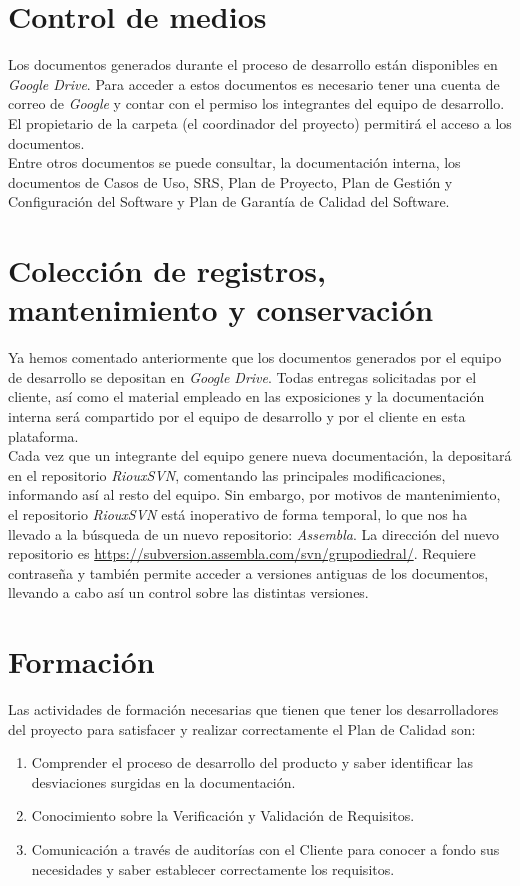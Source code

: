 \documentclass[11pt, a4paper, twoside, titlepage]{article}
\begin{document}
	\section{Control de medios} %
		Los documentos generados durante el proceso de desarrollo están disponibles en \textit{Google Drive}. Para acceder a estos documentos es necesario tener una cuenta de correo de \textit{Google} y contar con el permiso los integrantes del equipo de desarrollo. El propietario de la carpeta (el coordinador del proyecto) permitirá el acceso a los documentos. \\
		Entre otros documentos se puede consultar, la documentación interna, los documentos de Casos de Uso, SRS, Plan de Proyecto, Plan de Gestión y Configuración del Software y Plan de Garantía de Calidad del Software.


	\section{Colección de registros, mantenimiento y conservación} %
		Ya hemos comentado anteriormente que los documentos generados por el equipo de desarrollo se depositan en \textit{Google Drive}. Todas entregas solicitadas por el cliente, así como el material empleado en las exposiciones y la documentación interna será compartido por el equipo de desarrollo y por el cliente en esta plataforma. \\
		Cada vez que un integrante del equipo genere nueva documentación, la depositará en el repositorio \textit{RiouxSVN},  comentando las principales modificaciones, informando así al resto del equipo. Sin embargo, por motivos de mantenimiento, el repositorio \textit{RiouxSVN} está inoperativo de forma temporal, lo que nos ha llevado a la búsqueda de un nuevo repositorio: \textit{Assembla}. La dirección del nuevo repositorio es \url{https://subversion.assembla.com/svn/grupodiedral/}. Requiere contraseña y también permite acceder a versiones antiguas de los documentos, llevando a cabo así un control sobre las distintas versiones.

	\section{Formación} %
	Las actividades de formación necesarias que tienen que tener los desarrolladores del proyecto  para satisfacer y realizar correctamente el Plan de Calidad son:
		\begin{enumerate}
			\item Comprender el proceso de desarrollo del producto y saber identificar las desviaciones surgidas en la documentación.
			\item Conocimiento sobre la Verificación y Validación de Requisitos.
			\item Comunicación a través de auditorías con el Cliente para conocer a fondo sus necesidades y saber establecer correctamente
los requisitos.
		\end{enumerate}
		
\end{document}
